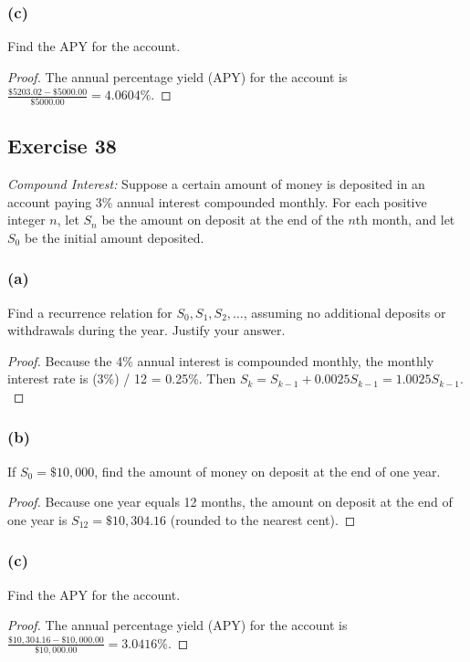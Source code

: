 \documentclass[14pt]{extarticle}
\newcommand{\dps}{\displaystyle}
\begin{document}
\subsubsection{(c)}
Find the APY for the account.

\begin{proof}
The annual percentage yield (APY) for the account is \(\dps \frac{\$5203.02 - \$5000.00}{\$5000.00} = 4.0604\%\).
\end{proof}

\subsection{Exercise 38}
{\it Compound Interest:} Suppose a certain amount of money is deposited in an account paying 3\% annual interest compounded monthly. For each positive integer $n$, let $S_n$ be the amount on deposit at the end of the $n$th month, and let $S_0$ be the initial amount deposited.

\subsubsection{(a)}
Find a recurrence relation for $S_0, S_1, S_2, \ldots$, assuming no additional deposits or withdrawals during the 
year. Justify your answer.

\begin{proof}
Because the 4\% annual interest is compounded monthly, the monthly interest rate is (3\%) / 12 = 0.25\%. Then 
\(S_k = S_{k-1} + 0.0025 S_{k - 1} = 1.0025 S_{k-1}.\)
\end{proof}

\subsubsection{(b)}
If $S_0 = \$10,000$, find the amount of money on deposit at the end of one year.

\begin{proof}
Because one year equals 12 months, the amount on deposit at the end of one year is \(S_{12} = \$10,304.16\)
(rounded to the nearest cent).
\end{proof}

\subsubsection{(c)}
Find the APY for the account.

\begin{proof}
The annual percentage yield (APY) for the account is \(\dps \frac{\$10,304.16 - \$10,000.00}{\$10,000.00} = 3.0416\%\).
\end{proof}
\end{document}
